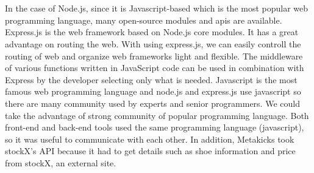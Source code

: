 \documentclass[conference]{IEEEtran}
\begin{document}
\begin{enumerate}
\\\\In the case of Node.js, since it is Javascript-based which is the most popular web programming language, many open-source modules and apis are available. Express.js is the web framework based on Node.js core modules. It has a great advantage on routing the web. With using express.js, we can easily controll the routing of web and organize web frameworks light and flexible. The middleware of various functions written in JavaScript code can be used in combination with Express by the developer selecting only what is needed. Javascript is the most famous web programming language and node.js and express.js use javascript so there are many community used by experts and senior programmers. We could take the advantage of strong community of popular programming language. Both front-end and back-end tools used the same programming language (javascript), so it was useful to communicate with each other. In addition, Metakicks took stockX's API because it had to get details such as shoe information and price from stockX, an external site.\\\\
\end{enumerate}
\end{document}
